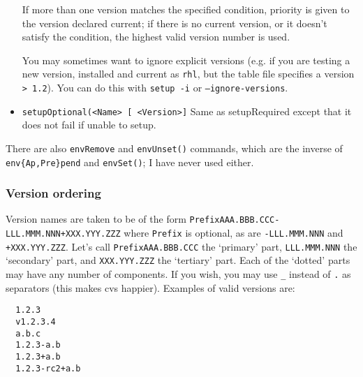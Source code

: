 \documentclass{article}
\newcommand{\code}[1]{\texttt{#1}}
\begin{document}
\begin{itemize}
    If more than one version matches the specified condition, priority is
    given to the version declared current;  if there is no current
    version, or it doesn't satisfy the condition, the highest valid version number
    is used.

    You may sometimes want to ignore explicit versions (e.g. if you are testing
    a new version, installed and current as \code{rhl}, but the table file specifies a
    version \code{> 1.2}).  You can do this with \code{setup -i} or \code{--ignore-versions}.

   \item \code{setupOptional(<Name> [ <Version>]}
     Same as setupRequired except that it does not fail if unable to setup.
\end{itemize}

There are also \code{envRemove} and \code{envUnset()} commands, which
are the inverse of \code{env\{Ap,Pre\}pend} and \code{envSet()}; I have
never used either.     

\subsubsection{Version ordering}
\label{versionOrdering}

Version names are taken to be of the form \code{PrefixAAA.BBB.CCC-LLL.MMM.NNN+XXX.YYY.ZZZ}
where \code{Prefix} is optional, as are \code{-LLL.MMM.NNN} and \code{+XXX.YYY.ZZZ}.  Let's call
\code{PrefixAAA.BBB.CCC} the `primary' part, \code{LLL.MMM.NNN} the `secondary' part, and \code{XXX.YYY.ZZZ}
the `tertiary' part.
Each of the `dotted' parts may have any number of components. If you wish, you may use \code{\_}
instead of \code{.} as separators (this makes cvs happier).  Examples of valid
versions are:
\begin{verbatim}
  1.2.3
  v1.2.3.4
  a.b.c
  1.2.3-a.b
  1.2.3+a.b
  1.2.3-rc2+a.b
\end{verbatim}
\end{document}
